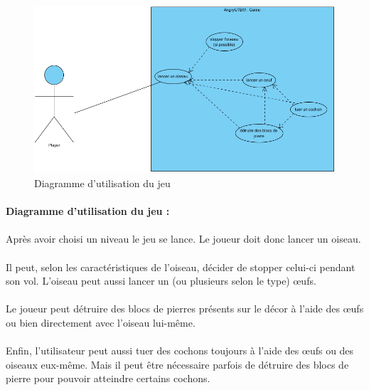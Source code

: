 \documentclass[a4paper,12pt]{report}
\begin{document}
\begin{figure}[H]
\begin{center}
\includegraphics[scale=0.7]{images/UseCase2.png} 
\end{center}
\caption{Diagramme d'utilisation du jeu}
\label{Diagramme d'utilisation du jeu}
\end{figure}

\paragraph{Diagramme d'utilisation du jeu :}

\paragraph{}Après avoir choisi un niveau le jeu se lance. Le joueur doit donc lancer un oiseau.
\paragraph{}Il peut, selon les caractéristiques de l'oiseau, décider de stopper celui-ci pendant son vol. L'oiseau peut aussi lancer un (ou plusieurs selon le type) œufs.
\paragraph{}Le joueur peut détruire des blocs de pierres présents sur le décor à l'aide des œufs ou bien directement avec l'oiseau lui-même.
\paragraph{}Enfin, l'utilisateur peut aussi tuer des cochons toujours à l'aide des œufs ou des oiseaux eux-même. Mais il peut être nécessaire parfois de détruire des blocs de pierre pour pouvoir atteindre certains cochons.
\end{document}
